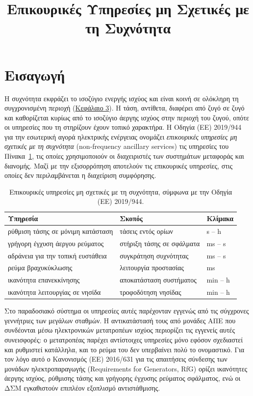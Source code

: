 \title{Επικουρικές Υπηρεσίες μη Σχετικές με τη Συχνότητα}

\section{Εισαγωγή}
\label{kef-02-theoria}

Η συχνότητα εκφράζει το ισοζύγιο ενεργής ισχύος και είναι κοινή σε ολόκληρη τη συγχρονισμένη
περιοχή (\hyperref[kef-03-theoria]{Κεφάλαιο 3}). Η τάση, αντίθετα, διαφέρει από ζυγό σε ζυγό
και καθορίζεται κυρίως από το ισοζύγιο άεργης ισχύος στην περιοχή του ζυγού, οπότε οι
υπηρεσίες που τη στηρίζουν έχουν τοπικό χαρακτήρα. Η Οδηγία (ΕΕ) 2019/944 για την εσωτερική
αγορά ηλεκτρικής ενέργειας ονομάζει \emph{επικουρικές υπηρεσίες μη σχετικές με τη συχνότητα}
(non-frequency ancillary services) τις υπηρεσίες του Πίνακα~\ref{tab:nfas}, τις οποίες
χρησιμοποιούν οι διαχειριστές των συστημάτων μεταφοράς και διανομής. Μαζί με την εξισορρόπηση
αποτελούν τις επικουρικές υπηρεσίες, στις οποίες δεν περιλαμβάνεται η διαχείριση συμφόρησης.

\begin{table}[!htbp]
\centering
\begin{tabular}{lll}
\hline
Υπηρεσία & Σκοπός & Κλίμακα \\
\hline
ρύθμιση τάσης σε μόνιμη κατάσταση & τάσεις εντός ορίων & s -- h \\
γρήγορη έγχυση άεργου ρεύματος & στήριξη τάσης σε σφάλματα & ms -- s \\
αδράνεια για την τοπική ευστάθεια & συγκράτηση συχνότητας & ms -- s \\
ρεύμα βραχυκύκλωσης & λειτουργία προστασίας & ms \\
ικανότητα επανεκκίνησης & αποκατάσταση συστήματος & min -- h \\
ικανότητα λειτουργίας σε νησίδα & τροφοδότηση νησίδας & min -- h \\
\hline
\end{tabular}
\caption{Επικουρικές υπηρεσίες μη σχετικές με τη συχνότητα, σύμφωνα με την Οδηγία (ΕΕ)
2019/944.}
\label{tab:nfas}
\end{table}

Στο παραδοσιακό σύστημα οι υπηρεσίες αυτές παρέχονταν εγγενώς από τις σύγχρονες γεννήτριες
των μεγάλων σταθμών. Η αντικατάστασή τους από μονάδες ΑΠΕ που συνδέονται μέσω ηλεκτρονικών
μετατροπέων ισχύος περιορίζει τις εγγενείς αυτές συνεισφορές: ο μετατροπέας παρέχει αντίστοιχες
υπηρεσίες μόνο εφόσον σχεδιαστεί και ρυθμιστεί κατάλληλα, και το ρεύμα του δεν υπερβαίνει
πολύ το ονομαστικό. Για τον λόγο αυτό ο Κανονισμός (ΕΕ) 2016/631 για τις απαιτήσεις σύνδεσης
των μονάδων ηλεκτροπαραγωγής (Requirements for Generators, RfG) ορίζει ικανότητες άεργης
ισχύος, ρύθμισης τάσης και γρήγορης έγχυσης ρεύματος σφάλματος, ενώ οι ΔΣΜ εγκαθιστούν
επιπλέον εξοπλισμό αντιστάθμισης.

